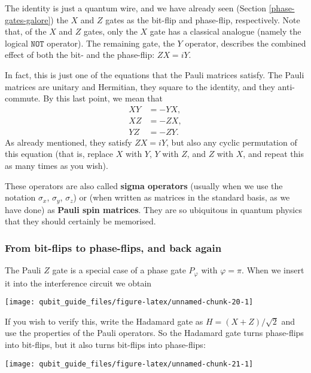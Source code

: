 \documentclass[fleqn]{article}
\begin{document}
The identity is just a quantum wire, and we have already seen (Section \ref{phase-gates-galore}) the \(X\) and \(Z\) gates as the bit-flip and phase-flip, respectively.
Note that, of the \(X\) and \(Z\) gates, only the \(X\) gate has a classical analogue (namely the logical \(\texttt{NOT}\) operator).
The remaining gate, the \(Y\) operator, describes the combined effect of both the bit- and the phase-flip: \(ZX=iY\).

In fact, this is just one of the equations that the Pauli matrices satisfy.
The Pauli matrices are unitary and Hermitian, they square to the identity, and they anti-commute.
By this last point, we mean that
\[
  \begin{aligned}
    XY&=-YX,
  \\XZ&=-ZX,
  \\YZ&=-ZY.
  \end{aligned}
\]
As already mentioned, they satisfy \(ZX=iY\), but also any cyclic permutation of this equation (that is, replace \(X\) with \(Y\), \(Y\) with \(Z\), and \(Z\) with \(X\), and repeat this as many times as you wish).

These operators are also called \textbf{sigma operators} (usually when we use the notation \(\sigma_x\), \(\sigma_y\), \(\sigma_z\)) or (when written as matrices in the standard basis, as we have done) as \textbf{Pauli spin matrices}.
They are so ubiquitous in quantum physics that they should certainly be memorised.

\hypertarget{from-bit-flips-to-phase-flips-and-back-again}{%
\subsubsection{From bit-flips to phase-flips, and back again}\label{from-bit-flips-to-phase-flips-and-back-again}}

The Pauli \(Z\) gate is a special case of a phase gate \(P_\varphi\) with \(\varphi=\pi\).
When we insert it into the interference circuit we obtain

\begin{center}\texttt{[image: qubit\_guide\_files/figure-latex/unnamed-chunk-20-1]} \end{center}

If you wish to verify this, write the Hadamard gate as \(H = (X+Z)/\sqrt{2}\) and use the properties of the Pauli operators.
So the Hadamard gate turns phase-flips into bit-flips, but it also turns bit-flips into phase-flips:

\begin{center}\texttt{[image: qubit\_guide\_files/figure-latex/unnamed-chunk-21-1]} \end{center}
\end{document}
